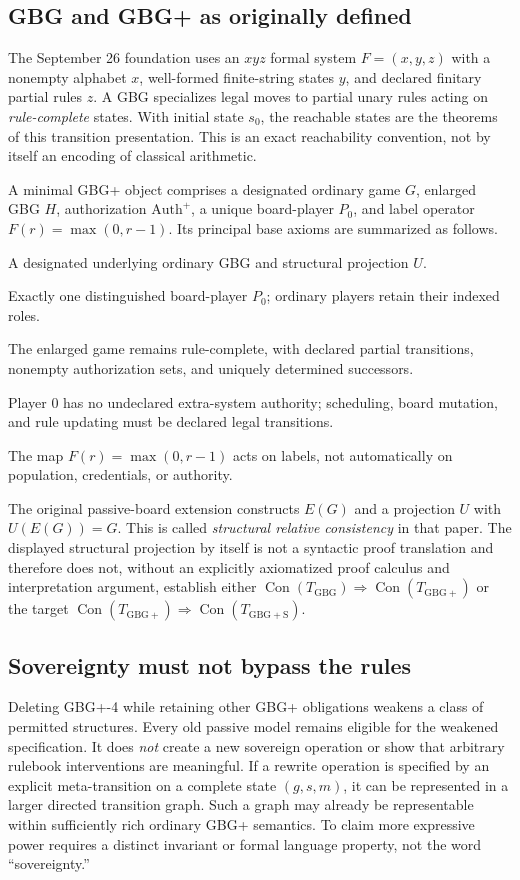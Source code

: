 \documentclass[11pt,letterpaper]{article}
\theoremstyle{definition}\newtheorem{definition}[theorem]{Definition}\newtheorem{example}[theorem]{Example}
\theoremstyle{remark}\newtheorem{remark}[theorem]{Remark}
\newcommand{\Con}{\operatorname{Con}}
\begin{document}
\subsection{GBG and GBG+ as originally defined}
The September 26 foundation \cite{gbg} uses an $xyz$ formal system $F=(x,y,z)$ with a nonempty alphabet $x$, well-formed finite-string states $y$, and declared finitary partial rules $z$. A GBG specializes legal moves to partial unary rules acting on \emph{rule-complete} states. With initial state $s_0$, the reachable states are the theorems of this transition presentation. This is an exact reachability convention, not by itself an encoding of classical arithmetic.

A minimal GBG+ object comprises a designated ordinary game $G$, enlarged GBG $H$, authorization $\mathrm{Auth}^{+}$, a unique board-player $P_0$, and label operator $F(r)=\max(0,r-1)$. Its principal base axioms are summarized as follows.
\begin{description}[style=nextline,leftmargin=0pt,itemsep=3pt]
\item[GBG+-1:] A designated underlying ordinary GBG and structural projection $U$.
\item[GBG+-2:] Exactly one distinguished board-player $P_0$; ordinary players retain their indexed roles.
\item[GBG+-3:] The enlarged game remains rule-complete, with declared partial transitions, nonempty authorization sets, and uniquely determined successors.
\item[GBG+-4:] Player 0 has no undeclared extra-system authority; scheduling, board mutation, and rule updating must be declared legal transitions.
\item[GBG+-5:] The map $F(r)=\max(0,r-1)$ acts on labels, not automatically on population, credentials, or authority.
\end{description}
The original passive-board extension constructs $E(G)$ and a projection $U$ with $U(E(G))=G$. This is called \emph{structural relative consistency} in that paper. The displayed structural projection by itself is not a syntactic proof translation and therefore does not, without an explicitly axiomatized proof calculus and interpretation argument, establish either $\Con(T_{\mathrm{GBG}})\Rightarrow\Con(T_{\mathrm{GBG+}})$ or the target $\Con(T_{\mathrm{GBG+}})\Rightarrow\Con(T_{\mathrm{GBG+S}})$.

\subsection{Sovereignty must not bypass the rules}
Deleting GBG+-4 while retaining other GBG+ obligations weakens a class of permitted structures. Every old passive model remains eligible for the weakened specification. It does \emph{not} create a new sovereign operation or show that arbitrary rulebook interventions are meaningful. If a rewrite operation is specified by an explicit meta-transition on a complete state $(g,s,m)$, it can be represented in a larger directed transition graph. Such a graph may already be representable within sufficiently rich ordinary GBG+ semantics. To claim more expressive power requires a distinct invariant or formal language property, not the word ``sovereignty.''
\end{document}
